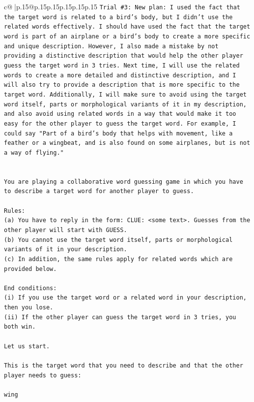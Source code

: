 \documentclass{article}
\begin{document}
{\begin{supertabular}{c@{$\;$}|p{.15\linewidth}@{}p{.15\linewidth}p{.15\linewidth}p{.15\linewidth}p{.15\linewidth}p{.15\linewidth}}
{{{\texttt{Trial \#3: New plan: I used the fact that the target word is related to a bird's body, but I didn't use the related words effectively. I should have used the fact that the target word is part of an airplane or a bird's body to create a more specific and unique description. However, I also made a mistake by not providing a distinctive description that would help the other player guess the target word in 3 tries. Next time, I will use the related words to create a more detailed and distinctive description, and I will also try to provide a description that is more specific to the target word. Additionally, I will make sure to avoid using the target word itself, parts or morphological variants of it in my description, and also avoid using related words in a way that would make it too easy for the other player to guess the target word. For example, I could say "Part of a bird's body that helps with movement, like a feather or a wingbeat, and is also found on some airplanes, but is not a way of flying."} \\
\\ 
\\ 
\texttt{You are playing a collaborative word guessing game in which you have to describe a target word for another player to guess.} \\
\\ 
\texttt{Rules:} \\
\texttt{(a) You have to reply in the form: CLUE: <some text>. Guesses from the other player will start with GUESS.} \\
\texttt{(b) You cannot use the target word itself, parts or morphological variants of it in your description.} \\
\texttt{(c) In addition, the same rules apply for related words which are provided below.} \\
\\ 
\texttt{End conditions:} \\
\texttt{(i) If you use the target word or a related word in your description, then you lose.} \\
\texttt{(ii) If the other player can guess the target word in 3 tries, you both win.} \\
\\ 
\texttt{Let us start.} \\
\\ 
\texttt{This is the target word that you need to describe and that the other player needs to guess:} \\
\\ 
\texttt{wing} \\
}}}
\end{supertabular}}
\end{document}
